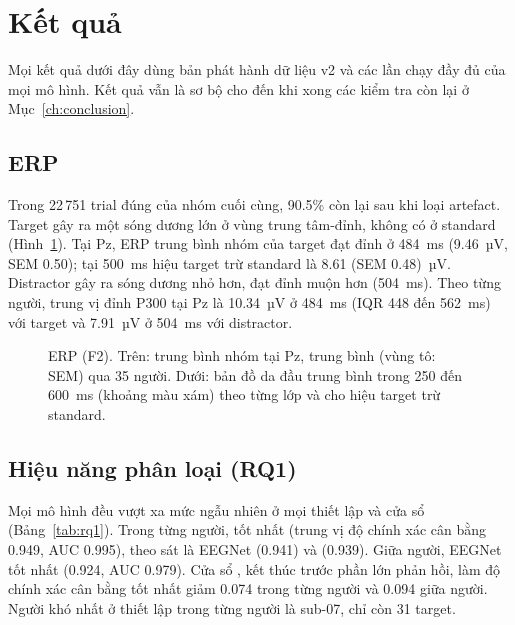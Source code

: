 \section{Kết quả}
\label{ch:results}

Mọi kết quả dưới đây dùng bản phát hành dữ liệu v2 và các lần chạy đầy đủ của mọi mô hình. Kết quả vẫn là sơ bộ cho đến khi xong các kiểm tra còn lại ở Mục~\ref{ch:conclusion}.

\subsection{ERP}
\label{sec:res-erp}
\label{sec:res-preproc}
Trong 22\,751 trial đúng của nhóm cuối cùng, 90.5\% còn lại sau khi loại artefact. Target gây ra một sóng dương lớn ở vùng trung tâm-đỉnh, không có ở standard (Hình~\ref{fig:erp}). Tại Pz, ERP trung bình nhóm của target đạt đỉnh ở 484~ms (9.46~µV, SEM 0.50); tại 500~ms hiệu target trừ standard là 8.61 (SEM 0.48)~µV. Distractor gây ra sóng dương nhỏ hơn, đạt đỉnh muộn hơn (504~ms). Theo từng người, trung vị đỉnh P300 tại Pz là 10.34~µV ở 484~ms (IQR 448 đến 562~ms) với target và 7.91~µV ở 504~ms với distractor.

\begin{figure}[H]
\centering
{}
\caption{ERP (F2). Trên: trung bình nhóm tại Pz, trung bình (vùng tô: SEM) qua 35 người. Dưới: bản đồ da đầu trung bình trong 250 đến 600~ms (khoảng màu xám) theo từng lớp và cho hiệu target trừ standard.}
\label{fig:erp}
\end{figure}

\subsection{Hiệu năng phân loại (RQ1)}
\label{sec:res-rq1}
Mọi mô hình đều vượt xa mức ngẫu nhiên ở mọi thiết lập và cửa sổ (Bảng~\ref{tab:rq1}). Trong từng người,  tốt nhất (trung vị độ chính xác cân bằng 0.949, AUC 0.995), theo sát là EEGNet (0.941) và  (0.939). Giữa người, EEGNet tốt nhất (0.924, AUC 0.979). Cửa sổ , kết thúc trước phần lớn phản hồi, làm độ chính xác cân bằng tốt nhất giảm 0.074 trong từng người và 0.094 giữa người. Người khó nhất ở thiết lập trong từng người là sub-07, chỉ còn 31 target.

